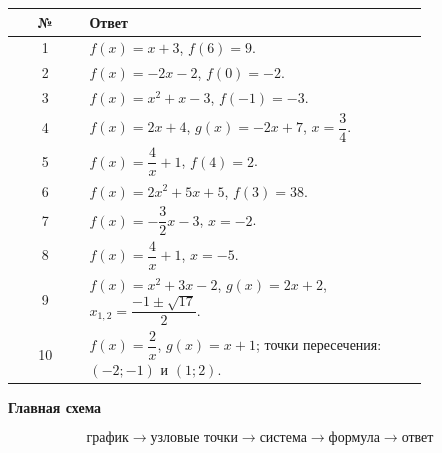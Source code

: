 \documentclass[a4paper,12pt]{article}
\begin{document}
\begin{center}
\renewcommand{\arraystretch}{1.35}
\begin{tabular}{@{}c p{0.82\linewidth}@{}}
\toprule
\textbf{№} & \textbf{Ответ} \\
\midrule
1 & $f(x)=x+3$, \quad $f(6)=9$. \\
2 & $f(x)=-2x-2$, \quad $f(0)=-2$. \\
3 & $f(x)=x^2+x-3$, \quad $f(-1)=-3$. \\
4 & $f(x)=2x+4$, $g(x)=-2x+7$, \quad $x=\dfrac34$. \\
5 & $f(x)=\dfrac4x+1$, \quad $f(4)=2$. \\
6 & $f(x)=2x^2+5x+5$, \quad $f(3)=38$. \\
7 & $f(x)=-\dfrac32x-3$, \quad $x=-2$. \\
8 & $f(x)=\dfrac4x+1$, \quad $x=-5$. \\
9 & $f(x)=x^2+3x-2$, $g(x)=2x+2$, \quad $x_{1,2}=\dfrac{-1\pm\sqrt{17}}2$. \\
10 & $f(x)=\dfrac2x$, $g(x)=x+1$; точки пересечения: $(-2;-1)$ и $(1;2)$. \\
\bottomrule
\end{tabular}
\end{center}

\vfill

\begin{center}
\textcolor{darkaccent}{\textbf{Главная схема}}

\[
\boxed{
\text{график}
\longrightarrow
\text{узловые точки}
\longrightarrow
\text{система}
\longrightarrow
\text{формула}
\longrightarrow
\text{ответ}
}
\]
\end{center}
\end{document}
